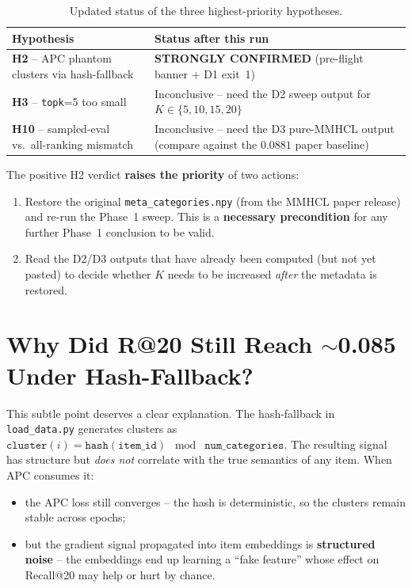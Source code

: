 \documentclass[11pt,a4paper]{article}
\begin{document}
\begin{table}[h]
\centering
\renewcommand{\arraystretch}{1.25}
\begin{tabularx}{\textwidth}{|l|X|}
\hline
\textbf{Hypothesis} & \textbf{Status after this run} \\
\hline
\textbf{H2} -- APC phantom clusters via hash-fallback &
\textbf{STRONGLY CONFIRMED} (pre-flight banner + D1 exit~1) \\
\hline
\textbf{H3} -- \texttt{topk}=5 too small &
Inconclusive -- need the D2 sweep output for $K \in \{5, 10, 15, 20\}$ \\
\hline
\textbf{H10} -- sampled-eval vs.\ all-ranking mismatch &
Inconclusive -- need the D3 pure-MMHCL output (compare against the
$0.0881$ paper baseline) \\
\hline
\end{tabularx}
\caption{Updated status of the three highest-priority hypotheses.}
\label{tab:hypotheses}
\end{table}

\noindent The positive H2 verdict \textbf{raises the priority} of two actions:

\begin{enumerate}[leftmargin=*]
  \item Restore the original \texttt{meta\_categories.npy} (from the MMHCL
        paper release) and re-run the Phase~1 sweep. This is a
        \textbf{necessary precondition} for any further Phase~1 conclusion
        to be valid.
  \item Read the D2/D3 outputs that have already been computed (but not yet
        pasted) to decide whether $K$ needs to be increased \emph{after} the
        metadata is restored.
\end{enumerate}

\section{Why Did R@20 Still Reach $\sim$0.085 Under Hash-Fallback?}

This subtle point deserves a clear explanation. The hash-fallback in
\texttt{load\_data.py} generates clusters as
\(
\texttt{cluster}(i) = \texttt{hash}(\texttt{item\_id}) \;\bmod\; \texttt{num\_categories}.
\)
The resulting signal has structure but \emph{does not} correlate with the
true semantics of any item. When APC consumes it:

\begin{itemize}[leftmargin=*]
  \item the APC loss still converges -- the hash is deterministic, so the
        clusters remain stable across epochs;
  \item but the gradient signal propagated into item embeddings is
        \textbf{structured noise} -- the embeddings end up learning a
        ``fake feature'' whose effect on Recall@20 may help or hurt by
        chance.
\end{itemize}
\end{document}
